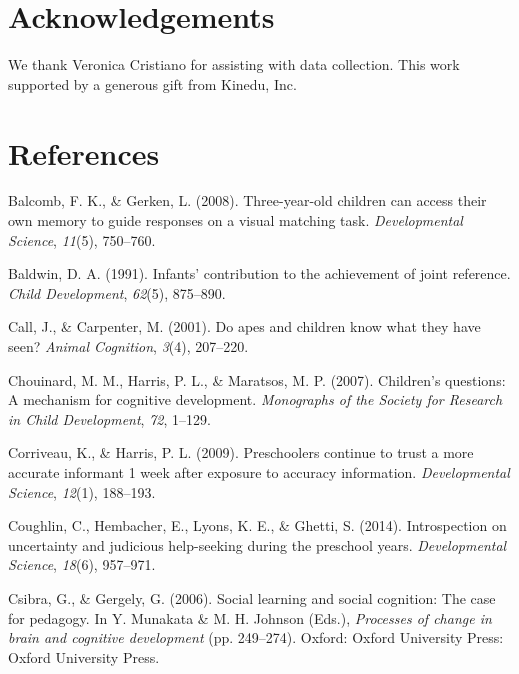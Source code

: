 \documentclass[a4paper,man,apacite,floatsintext]{apa6}
\begin{document}
\section{Acknowledgements}\label{acknowledgements}

We thank Veronica Cristiano for assisting with data collection. This
work supported by a generous gift from Kinedu, Inc.

\section{References}\label{references}

\setlength{\parindent}{-0.1in} \setlength{\leftskip}{0.125in} \noindent

\hypertarget{refs}{}
\hypertarget{ref-Balcomb2008}{}
Balcomb, F. K., \& Gerken, L. (2008). Three-year-old children can access
their own memory to guide responses on a visual matching task.
\emph{Developmental Science}, \emph{11}(5), 750--760.

\hypertarget{ref-Baldwin1991}{}
Baldwin, D. A. (1991). Infants' contribution to the achievement of joint
reference. \emph{Child Development}, \emph{62}(5), 875--890.

\hypertarget{ref-Call2001}{}
Call, J., \& Carpenter, M. (2001). Do apes and children know what they
have seen? \emph{Animal Cognition}, \emph{3}(4), 207--220.

\hypertarget{ref-Chouinard2007}{}
Chouinard, M. M., Harris, P. L., \& Maratsos, M. P. (2007). Children's
questions: A mechanism for cognitive development. \emph{Monographs of
the Society for Research in Child Development}, \emph{72}, 1--129.

\hypertarget{ref-Corriveau2009}{}
Corriveau, K., \& Harris, P. L. (2009). Preschoolers continue to trust a
more accurate informant 1 week after exposure to accuracy information.
\emph{Developmental Science}, \emph{12}(1), 188--193.

\hypertarget{ref-Coughlin2014}{}
Coughlin, C., Hembacher, E., Lyons, K. E., \& Ghetti, S. (2014).
Introspection on uncertainty and judicious help-seeking during the
preschool years. \emph{Developmental Science}, \emph{18}(6), 957--971.

\hypertarget{ref-Csibra2006}{}
Csibra, G., \& Gergely, G. (2006). Social learning and social cognition:
The case for pedagogy. In Y. Munakata \& M. H. Johnson (Eds.),
\emph{Processes of change in brain and cognitive development} (pp.
249--274). Oxford: Oxford University Press: Oxford University Press.
\end{document}
